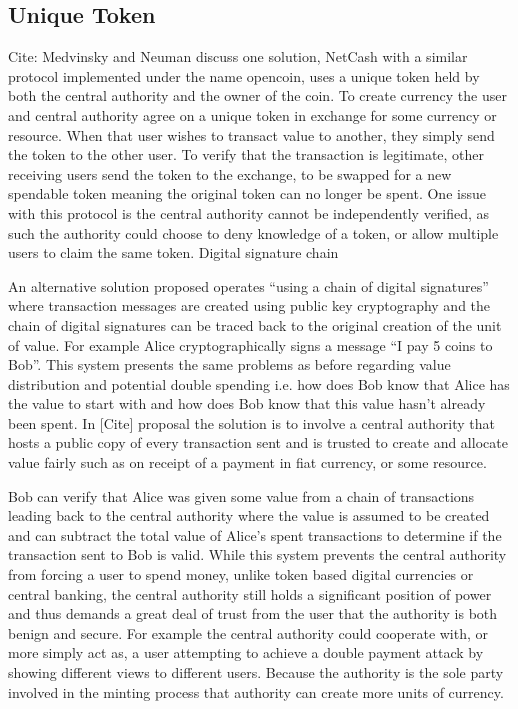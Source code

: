\subsection{Unique Token}
Cite: Medvinsky and Neuman discuss one solution, NetCash with a similar protocol implemented under the name opencoin, uses a unique token held by both the central authority and the owner of the coin. To create currency the user and central authority agree on a unique token in exchange for some currency or resource. When that user wishes to transact value to another, they simply send the token to the other user.  To verify that the transaction is legitimate, other receiving users send the token to the exchange, to be swapped for a new spendable token meaning the original token can no longer be spent. One issue with this protocol is the central authority cannot be independently verified, as such the authority could choose to deny knowledge of a token, or allow multiple users to claim the same token.
Digital signature chain

An alternative solution proposed operates ``using a chain of digital signatures'' where transaction messages are created using public key cryptography and the chain of digital signatures can be traced back to the original creation of the unit of value. For example Alice cryptographically signs a message “I pay 5 coins to Bob”.  This system presents the same problems as before regarding value distribution and potential double spending i.e. how does Bob know that Alice has the value to start with and how does Bob know that this value hasn't already been spent. In [Cite] proposal the solution is to involve a central authority that hosts a public copy of every transaction sent and is trusted to create and allocate value fairly such as on receipt of a payment in fiat currency, or some resource.

Bob can verify that Alice was given some value from a chain of transactions leading back to the central authority where the value is assumed to be created and can subtract the total value of Alice’s spent transactions to determine if the transaction sent to Bob is valid.  While this system prevents the central authority from forcing a user to spend money, unlike token based digital currencies or central banking, the central authority still holds a significant position of power and thus demands a great deal of trust from the user that the authority is both benign and secure. For example the central authority could cooperate with, or more simply act as, a user attempting to achieve a double payment attack by showing different views to different users. Because the authority is the sole party involved in the minting process that authority can create more units of currency.


